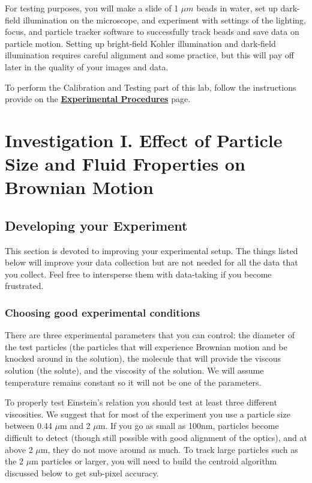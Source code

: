 \documentclass{../lab}
\begin{document}
For testing purposes, you will make a slide of 1 $\mu m$ beads in water, set up dark-field illumination on the microscope, and experiment with settings of the lighting, focus, and particle tracker software to successfully track beads and save data on particle motion. Setting up bright-field Kohler illumination and dark-field illumination requires careful alignment and some practice, but this will pay off later in the quality of your images and data.


To perform the Calibration and Testing part of this lab, follow the instructions provide on the \href{http://experimentationlab.berkeley.edu/node/84}{\textbf{Experimental Procedures}} page.

\section{Investigation I. Effect of Particle Size and Fluid Froperties on Brownian Motion}
\label{sec:InvestigationI}

\subsection{Developing your Experiment}

This section is devoted to improving your experimental setup. The things listed below will improve your data collection but are not needed for all the data that you collect. Feel free to intersperse them with data-taking if you become frustrated.

\subsubsection{Choosing good experimental conditions}

There are three experimental parameters that you can control: the diameter of the test particles (the particles that will experience Brownian motion and be knocked around in the solution), the molecule that will provide the viscous solution (the solute), and the viscosity of the solution. We will assume temperature remains constant so it will not be one of the parameters.

To properly test Einstein's relation you should test at least three different viscosities. We suggest that for most of the experiment you use a particle size between 0.44 $\mu$m and 2 $\mu$m. If you go as small as 100nm, particles become difficult to detect (though still possible with good alignment of the optics), and at above 2 $\mu$m, they do not move around as much. To track large particles such as the 2 $\mu$m particles or larger, you will need to build the centroid algorithm discussed below to get sub-pixel accuracy.
\end{document}
